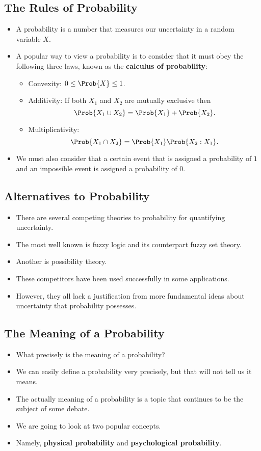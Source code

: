 \subsection*{The Rules of Probability}
\begin{itemize}
      \item A probability is a number that measures our uncertainty in a random
            variable $X$.
      \item  A popular way to view a probability is to consider that it must obey the
            following three laws, known as the \textbf{calculus of probability}:
            \begin{itemize}
                  \item Convexity: $ 0\le \Prob{X}\le 1 $.
                  \item Additivity: If both $X_1$ and $X_2$ are mutually exclusive then
                        \[ \Prob{X_1\cup X_2}=\Prob{X_1}+\Prob{X_2}. \]
                  \item Multiplicativity:
                        \[ \Prob{X_1\cap X_2}=\Prob{X_1}\Prob{X_2\given X_1}. \]
            \end{itemize}
      \item We must also consider that a certain event that is assigned a probability
            of $1$ and an impossible event is assigned a probability of $0$.
\end{itemize}
\subsection*{Alternatives to Probability}
\begin{itemize}
      \item There are several competing theories to probability for quantifying
            uncertainty.
      \item The most well known is fuzzy logic and its counterpart fuzzy set theory.
      \item Another is possibility theory.
      \item These competitors have been used successfully in some applications.
      \item However, they all lack a justification from more fundamental ideas about
            uncertainty that probability possesses.
\end{itemize}
\subsection*{The Meaning of a Probability}
\begin{itemize}
      \item What precisely is the meaning of a probability?
      \item We can easily define a probability very precisely, but that will not tell us
            it means.
      \item The actually meaning of a probability is a topic that continues to be the
            subject of some debate.
      \item We are going to look at two popular concepts.
      \item Namely, \textbf{physical probability} and \textbf{psychological probability}.
\end{itemize}
